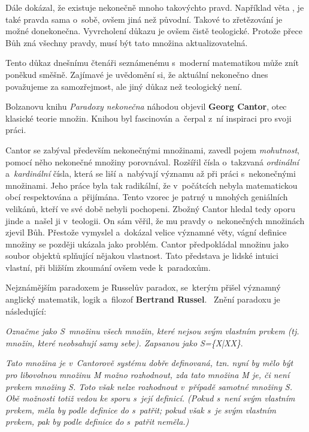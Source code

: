 \documentclass[czech]{article}
\begin{document}
Dále dokázal, že existuje nekonečně mnoho takovýchto pravd. Například věta , je také pravda sama o~sobě, ovšem jiná než původní. Takové to zřetězování je možné donekonečna. Vyvrcholení důkazu je ovšem čistě teologické. Protože přece Bůh zná všechny pravdy, musí být tato množina aktualizovatelná.~\cite{vopenka}

Tento důkaz dnešnímu čtenáři seznámenému s~moderní matematikou může znít poněkud směšně. Zajímavé je uvědomění si, že aktuální nekonečno dnes považujeme za samozřejmost, ale jiný důkaz než teologický není.

Bolzanovu knihu \textit{Paradoxy nekonečna} náhodou objevil \textbf{Georg Cantor}, otec klasické teorie množin. Knihou byl fascinován a~čerpal z~ní inspiraci pro svoji práci.

Cantor se zabýval především nekonečnými množinami, zavedl pojem \textit{mohutnost}, pomocí něho nekonečné množiny porovnával. Rozšířil čísla o~takzvaná \textit{ordinální} a~\textit{kardinální} čísla, která se liší a~nabývají významu až při práci s~nekonečnými množinami. Jeho práce byla tak radikální, že v~počátcích nebyla matematickou obcí respektována a~přijímána. Tento vzorec je patrný u mnohých geniálních velikánů, kteří ve své době nebyli pochopeni. Zbožný Cantor hledal tedy oporu jinde a~našel ji v~teologii. On sám věřil, že mu pravdy o~nekonečných množinách zjevil Bůh. Přestože vymyslel a~dokázal velice významné věty, vágní definice množiny se později ukázala jako problém.
Cantor předpokládal množinu jako soubor objektů splňující nějakou vlastnost. Tato představa je lidské intuici vlastní, při bližším zkoumání ovšem vede k~paradoxům.

Nejznámějším paradoxem je Russelův paradox, se~kterým přišel významný anglický matematik, logik a~filozof \textbf{Bertrand Russel}.~\cite{russell_paradox} Znění paradoxu je následující:

\begin{flushleft}
\textit{Označme jako S~množinu všech množin, které nejsou svým vlastním prvkem (tj. množin, které neobsahují samy sebe). Zapsanou jako {\displaystyle S=\{X|X\notin X\}}}.

\textit{Tato množina je v~Cantorově systému dobře definovaná, tzn. nyní by mělo být pro libovolnou množinu M možno rozhodnout, zda tato množina M je, či není prvkem množiny S. Toto však nelze rozhodnout v~případě samotné množiny S. Obě možnosti totiž vedou ke sporu s~její definicí. (Pokud s~není svým vlastním prvkem, měla by podle definice do s~patřit; pokud však s~je svým vlastním prvkem, pak by podle definice do s~patřit neměla.)}

\end{flushleft}
\end{document}
